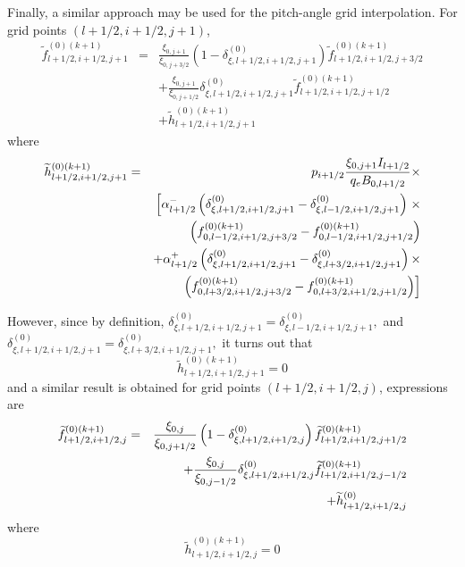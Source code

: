 Finally, a similar approach may be used for the pitch-angle grid
interpolation. For grid points $\left( l+1/2,i+1/2,j+1\right) $,
\begin{eqnarray}
\widetilde{f}_{l+1/2,i+1/2,j+1}^{\left( 0\right) (k+1)} &=&\frac{\xi _{0,j+1}%
}{\xi _{0,j+3/2}}\left( 1-\delta _{\xi ,l+1/2,i+1/2,j+1}^{(0)}\right)
\widetilde{f}_{l+1/2,i+1/2,j+3/2}^{(0)(k+1)}  \nonumber \\
&&+\frac{\xi _{0,j+1}}{\xi _{0,j+1/2}}\delta _{\xi ,l+1/2,i+1/2,j+1}^{(0)}%
\widetilde{f}_{l+1/2,i+1/2,j+1/2}^{(0)(k+1)}  \nonumber \\
&&+\widetilde{h}_{l+1/2,i+1/2,j+1}^{\left( 0\right) (k+1)}
\end{eqnarray}
where
\begin{eqnarray}
\widetilde{h}_{l+1/2,i+1/2,j+1}^{\left( 0\right) (k+1)} &=&p_{i+1/2}\frac{%
\xi _{0,j+1}I_{l+1/2}}{q_{e}B_{0,l+1/2}}\times   \nonumber \\
&&\left[ \alpha _{l+1/2}^{-}\left( \delta _{\xi
,l+1/2,i+1/2,j+1}^{(0)}-\delta _{\xi ,l-1/2,i+1/2,j+1}^{(0)}\right) \right.
\times   \nonumber \\
&&\left(
f_{0,l-1/2,i+1/2,j+3/2}^{(0)(k+1)}-f_{0,l-1/2,i+1/2,j+1/2}^{(0)(k+1)}\right)
\nonumber \\
&&+\alpha _{l+1/2}^{+}\left( \delta _{\xi ,l+1/2,i+1/2,j+1}^{(0)}-\delta
_{\xi ,l+3/2,i+1/2,j+1}^{(0)}\right) \times   \nonumber \\
&&\left. \left(
f_{0,l+3/2,i+1/2,j+3/2}^{(0)(k+1)}-f_{0,l+3/2,i+1/2,j+1/2}^{(0)(k+1)}\right)
\right]
\end{eqnarray}

However, since by definition, $\delta _{\xi ,l+1/2,i+1/2,j+1}^{(0)}=\delta
_{\xi ,l-1/2,i+1/2,j+1}^{(0)},$ and $\delta _{\xi
,l+1/2,i+1/2,j+1}^{(0)}=\delta _{\xi ,l+3/2,i+1/2,j+1}^{(0)},$ it turns out
that
\begin{equation}
\widetilde{h}_{l+1/2,i+1/2,j+1}^{\left( 0\right) (k+1)}=0
\end{equation}
and a similar result is obtained for grid points $\left(
l+1/2,i+1/2,j\right) $, expressions are
\begin{eqnarray}
\widetilde{f}_{l+1/2,i+1/2,j}^{\left( 0\right) (k+1)} &=&\frac{\xi _{0,j}}{%
\xi _{0,j+1/2}}\left( 1-\delta _{\xi ,l+1/2,i+1/2,j}^{(0)}\right) \widetilde{
f}_{l+1/2,i+1/2,j+1/2}^{(0)(k+1)}  \nonumber \\
&&+\frac{\xi _{0,j}}{\xi _{0,j-1/2}}\delta _{\xi ,l+1/2,i+1/2,j}^{(0)}%
\widetilde{f}_{l+1/2,i+1/2,j-1/2}^{(0)(k+1)}  \nonumber \\
&&+\widetilde{h}_{l+1/2,i+1/2,j}^{\left( 0\right) }
\end{eqnarray}
where
\begin{equation}
\widetilde{h}_{l+1/2,i+1/2,j}^{\left( 0\right) (k+1)}=0
\end{equation}
